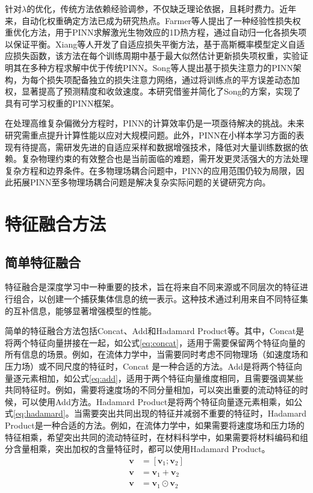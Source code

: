 针对$\lambda$的优化，传统方法依赖经验调参，不仅缺乏理论依据，且耗时费力。近年来，自动化权重确定方法已成为研究热点。Farmer等人提出了一种经验性损失权重优化方法，用于PINN求解激光生物效应的1D热方程\cite{farmerEmpiricalLossWeight2024}，通过自动归一化各损失项以保证平衡。Xiang等人开发了自适应损失平衡方法，基于高斯概率模型定义自适应损失函数\cite{xiangSelfadaptiveLossBalanced2022}，该方法在每个训练周期中基于最大似然估计更新损失项权重，实验证明其在多种方程求解中优于传统PINN。Song等人提出基于损失注意力的PINN架构，为每个损失项配备独立的损失注意力网络\cite{songLossattentionalPhysicsinformedNeural2024}，通过将训练点的平方误差动态加权，显著提高了预测精度和收敛速度。本研究借鉴并简化了Song的方案，实现了具有可学习权重的PINN框架。

在处理高维复杂偏微分方程时，PINN的计算效率仍是一项亟待解决的挑战。未来研究需重点提升计算性能以应对大规模问题\cite{Shah2024BenchmarkingQA-PINN}。此外，PINN在小样本学习方面的表现有待提高，需研发先进的自适应采样和数据增强技术，降低对大量训练数据的依赖。复杂物理约束的有效整合也是当前面临的难题，需开发更灵活强大的方法处理复杂方程和边界条件。在多物理场耦合问题中，PINN的应用范围仍较为局限\cite{Hillebrecht2022Certified,Haitsiukevich2023Improved}，因此拓展PINN至多物理场耦合问题是解决复杂实际问题的关键研究方向。

\section{特征融合方法}
\subsection{简单特征融合}
特征融合是深度学习中一种重要的技术，旨在将来自不同来源或不同层次的特征进行组合，以创建一个捕获集体信息的统一表示。这种技术通过利用来自不同特征集的互补信息，能够显著增强模型的性能。

简单的特征融合方法包括Concat、Add和Hadamard Product等。其中，Concat是将两个特征向量拼接在一起，如公式\eqref{eq:concat}，适用于需要保留两个特征向量的所有信息的场景。例如，在流体力学中，当需要同时考虑不同物理场（如速度场和压力场）或不同尺度的特征时，Concat 是一种合适的方法。Add是将两个特征向量逐元素相加，如公式\eqref{eq:add}，适用于两个特征向量维度相同，且需要强调某些共同特征时。例如，需要将速度场的不同分量相加，可以突出重要的流动特征的时候，可以使用Add方法。Hadamard Product是将两个特征向量逐元素相乘，如公式\eqref{eq:hadamard}。当需要突出共同出现的特征并减弱不重要的特征时，Hadamard Product是一种合适的方法。例如，在流体力学中，如果需要将速度场和压力场的特征相乘，希望突出共同的流动特征时，在材料科学中，如果需要将材料编码和组分含量相乘，突出加权的含量特征时，都可以使用Hadamard Product。
\begin{align}
  \mathbf{v} & = [\mathbf{v}_1; \mathbf{v}_2] \label{eq:concat}          \\
  \mathbf{v} & = \mathbf{v}_1 + \mathbf{v}_2    \label{eq:add}           \\
  \mathbf{v} & = \mathbf{v}_1 \odot \mathbf{v}_2     \label{eq:hadamard}
\end{align}

